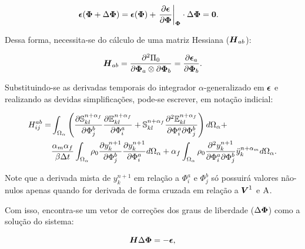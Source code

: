 \begin{equation}
    \begin{split}
        &\boldsymbol{\epsilon}(\boldsymbol{\Phi}+\Delta\boldsymbol{\Phi})=\boldsymbol{\epsilon}(\boldsymbol{\Phi})+\left.\frac{\partial{\boldsymbol{\epsilon}}}{\partial{\boldsymbol{\Phi}}}\right|_{\boldsymbol{\boldsymbol{\Phi}}}\cdot\Delta\boldsymbol{\Phi}=\boldsymbol{0}\text{.}
    \end{split}
\end{equation}

\noindent Dessa forma, necessita-se do cálculo de uma matriz Hessiana ($\boldsymbol{H}_{ab}$):

\begin{equation}
    \boldsymbol{H}_{ab}=\frac{\partial^2\Pi_0}{\partial\boldsymbol{\Phi}_a\otimes\partial\boldsymbol{\Phi}_b}=\frac{\partial{\boldsymbol{\epsilon}_a}}{\partial{\boldsymbol{\Phi}_b}}\text{.}
\end{equation}

Substituindo-se as derivadas temporais do integrador $\alpha$-generalizado em $\boldsymbol{\epsilon}$ e realizando as devidas simplificações, pode-se escrever, em notação indicial:

\begin{equation}
    \begin{split}
        H_{ij}^{ab}=&\int_{\Omega_\alpha}{\left({\frac{\partial{\boldsymbol{\mathbb{S}}^{n+\alpha_f}_{kl}}}{\partial{\Phi_j^b}}\frac{\partial{\mathbb{E}^{n+\alpha_f}_{kl}}}{\partial{\Phi_i^a}}+\boldsymbol{\mathbb{S}}^{n+\alpha_f}_{kl}\frac{\partial^2{\mathbb{E}^{n+\alpha_f}_{kl}}}{\partial{\Phi_i^a}\partial{\Phi_j^b}}}\right) d\Omega_\alpha}+\\
        &\frac{\alpha_m\alpha_f}{\beta\Delta t}\int_{\Omega_\alpha}{\rho_0\frac{\partial{y_k^{n+1}}}{\partial{\Phi_j^b}}\frac{\partial{y_k^{n+1}}}{\partial{\Phi_i^a}} d\Omega_\alpha}+\alpha_f\int_{\Omega_\alpha}{\rho_0\frac{\partial^2{y_k^{n+1}}}{\partial{\Phi_i^a}\partial{\Phi_j^b}}\ddot{y}_k^{n+\alpha_m} d\Omega_\alpha}\text{.}
    \end{split}
    \label{eq:CSD-Hijab}
\end{equation}

%

Note que a derivada mista de $y_k^{n+1}$ em relação a $\Phi_i^a$ e $\Phi_j^b$ só possuirá valores não-nulos apenas quando for derivada de forma cruzada em relação a $\boldsymbol{V}^1$ e $\mathrm{A}$.

Com isso, encontra-se um vetor de correções dos graus de liberdade ($\Delta\boldsymbol{\Phi}$) como a solução do sistema:

\begin{equation}
    \boldsymbol{H}\Delta\boldsymbol{\Phi}=-\boldsymbol{\epsilon}\text{,}
\end{equation}

